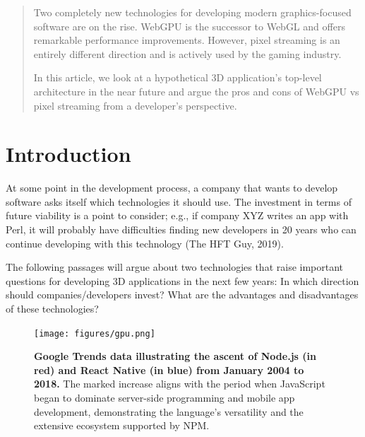 \documentclass[10pt]{article}
\begin{document}
\begin{sloppypar}
  \begin{abstract}
    Two completely new technologies for developing modern graphics-focused software are on the rise. WebGPU is the successor to WebGL and offers remarkable performance improvements. However, pixel streaming is an entirely different direction and is actively used by the gaming industry.

    In this article, we look at a hypothetical 3D application’s top-level architecture in the near future and argue the pros and cons of WebGPU vs pixel streaming from a developer’s perspective.
  \end{abstract}

  \pagebreak
  \tableofcontents
  \pagebreak
  \listoffigures
  \pagebreak
  \listoftables
  \pagebreak
  \lstlistoflistings
  \pagebreak


  \section{Introduction}
  \label{sec:introduction}

  At some point in the development process, a company that wants to develop software asks itself which technologies it should use. The investment in terms of future viability is a point to consider; e.g., if company XYZ writes an app with Perl, it will probably have difficulties finding new developers in 20 years who can continue developing with this technology (The HFT Guy, 2019).

  The following passages will argue about two technologies that raise important questions for developing 3D applications in the next few years: In which direction should companies/developers invest? What are the advantages and disadvantages of these technologies?

  \begin{figure}[ht]
    \centering
    \texttt{[image: figures/gpu.png]}
    \caption[Google Trends data illustrating the ascent of Node.js and React Native.]{\textbf{Google Trends data illustrating the ascent of Node.js (in red) and React Native (in blue) from January 2004 to 2018.} The marked increase aligns with the period when JavaScript began to dominate server-side programming and mobile app development, demonstrating the language’s versatility and the extensive ecosystem supported by NPM.}
    \label{fig:gpu}
  \end{figure}


\end{sloppypar}
\end{document}
